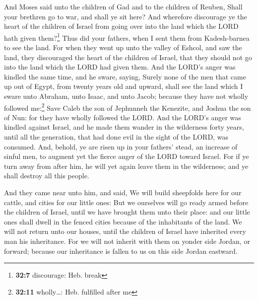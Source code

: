  And Moses said unto the children of Gad and to the
children of Reuben, Shall your brethren go to war, and shall ye sit
here?  And wherefore discourage ye the heart of the
children of Israel from going over into the land which the LORD hath
given them?\footnote{\textbf{32:7} discourage: Heb. break}
 Thus did your fathers, when I sent them from
Kadesh-barnea to see the land.  For when they went up unto
the valley of Eshcol, and saw the land, they discouraged the heart of
the children of Israel, that they should not go into the land which the
LORD had given them.  And the LORD's anger was kindled
the same time, and he sware, saying,  Surely none of the
men that came up out of Egypt, from twenty years old and upward, shall
see the land which I sware unto Abraham, unto Isaac, and unto Jacob;
because they have not wholly followed me:\footnote{\textbf{32:11}
  wholly\ldots: Heb. fulfilled after me}  Save Caleb the
son of Jephunneh the Kenezite, and Joshua the son of Nun: for they have
wholly followed the LORD.  And the LORD's anger was
kindled against Israel, and he made them wander in the wilderness forty
years, until all the generation, that had done evil in the sight of the
LORD, was consumed.  And, behold, ye are risen up in your
fathers' stead, an increase of sinful men, to augment yet the fierce
anger of the LORD toward Israel.  For if ye turn away
from after him, he will yet again leave them in the wilderness; and ye
shall destroy all this people.

 And they came near unto him, and said, We will build
sheepfolds here for our cattle, and cities for our little ones:
 But we ourselves will go ready armed before the children
of Israel, until we have brought them unto their place: and our little
ones shall dwell in the fenced cities because of the inhabitants of the
land.  We will not return unto our houses, until the
children of Israel have inherited every man his inheritance.
 For we will not inherit with them on yonder side Jordan,
or forward; because our inheritance is fallen to us on this side Jordan
eastward.


